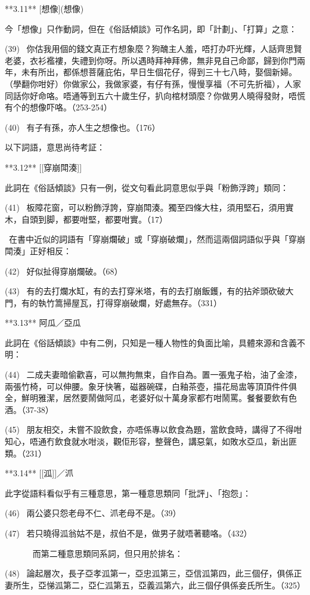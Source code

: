 **3.11** [想像](想像)

今「想像」只作動詞，但在《俗話傾談》可作名詞，即「計劃」、「打算」之意：

(39)  你估我用個的錢文真正冇想象麼？狗醜主人羞，唔打办吓光輝，人話齊思賢老婆，衣衫襤褸，失禮到你呀。所以遇時拜神拜佛，無非見自己命鄙，歸到你門兩年，未有所出，都係想菩薩庇佑，早日生個花仔，得到三十七八時，娶個新婦。（學翻你咁好）你做家公，我做家婆，有仔有孫，慢慢享福（不可先折福），人家同話你好命咯。唔通等到五六十歲生仔，扒向棺材頭麼？你做男人曉得發財，唔慌有个的想像吓咯。（253-254）

(40)  有子有孫，亦人生之想像也。（176）

以下詞語，意思尚待考証：

**3.12** [[穿崩閗湊]]

此詞在《俗話傾談》只有一例，從文句看此詞意思似乎與「粉飾浮跨」類同：

(41)  板障花窗，可以粉飾浮誇，穿崩閗湊。獨至四條大柱，須用堅石，須用實木，自頭到脚，都要咁堅，都要咁實。（17）

 在書中近似的詞語有「穿崩爛破」或「穿崩破爛」，然而這兩個詞語似乎與「穿崩閗湊」正好相反：

(42)  好似扯得穿崩爛破。（68）

(43)  有的去打爛水缸，有的去打穿米塔，有的去打崩飯鑊，有的拈斧頭砍破大門，有的執竹篙掃屋瓦，打得穿崩破爛，好處無存。（331）

**3.13** 阿瓜／亞瓜

此詞在《俗話傾談》中有二例，只知是一種人物性的負面比喻，具體來源和含義不明：

(44)  二成夫妻暗偷歡喜，可以無拘無束，自作自為。置一張鬼子枱，油了金漆，兩張竹椅，可以伸腰。象牙快箸，磁器碗碟，白釉茶壺，描花局盅等頂頂件件俱全，鮮明雅潔，居然要鬧做阿瓜，老婆好似十萬身家都冇咁鬧罵。餐餐要飲有色酒。（37-38）

(45)  朋友相交，未嘗不設飲食，亦唔係專以飲食為題，當飲食時，講得了不得咁知心，唔通冇飲食就水咁淡，觀佢形容，整聲色，講惡氣，如敗水亞瓜，新出匪類。（231）

**3.14** [[泒]]／沠

此字從語料看似乎有三種意思，第一種意思類同「批評」、「抱怨」：

(46)  兩公婆只怨老母不仁、沠老母不是。（39）

(47)  若只曉得泒翁姑不是，叔伯不是，做男子就唔著聽咯。（432）

       而第二種意思類同系詞，但只用於排名：

(48)  論起層次，長子亞孝泒第一，亞忠泒第三，亞信泒第四，此三個仔，俱係正妻所生，亞悌泒第二，亞仁泒第五，亞義泒第六，此三個仔俱係妾氏所生。（325）


